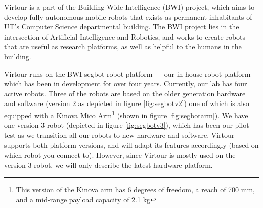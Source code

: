 \documentclass[
  oneside,
  11pt, a4paper,
  footinclude=true,
  headinclude=true,
  cleardoublepage=empty
]{article}
\begin{document}
Virtour is a part of the Building Wide Intelligence (BWI) project, which aims
to develop fully-autonomous mobile robots that exists as permanent inhabitants
of UT's Computer Science departmental building. The BWI project lies in the
intersection of Artificial Intelligence and Robotics, and works to create
robots that are useful as research platforms, as well as helpful to the humans
in the building.

Virtour runs on the BWI segbot robot platform --- our in-house robot platform
which has been in development for over four years. Currently, our lab has four
active robots. Three of the robots are based on the older generation hardware
and software (version 2 as depicted in figure \ref{fig:segbotv2}) one of which
is also equipped with a Kinova Mico Arm\footnote{This version of the Kinova arm
has 6 degrees of freedom, a reach of 700 mm, and a mid-range payload capacity
of 2.1 kg} (shown in figure \ref{fig:segbotarm}). We have one version 3 robot
(depicted in figure \ref{fig:segbotv3}), which has been our pilot test as we
transition all our robots to new hardware and software. Virtour supports both
platform versions, and will adapt its features accordingly (based on which
robot you connect to). However, since Virtour is mostly used on the version 3
robot, we will only describe the latest hardware platform.
\end{document}
